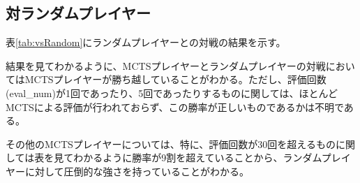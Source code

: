 \documentclass{jsarticle}
\begin{document}
\subsection{対ランダムプレイヤー}
表\ref{tab:vsRandom}にランダムプレイヤーとの対戦の結果を示す。\par
\begin{table}[hbtp]
    \caption{対ランダムプレイヤーでの勝率}
    \label{tab:vsRandom}
    \begin{center}
    \end{center}
\end{table}
結果を見てわかるように、MCTSプレイヤーとランダムプレイヤーの対戦においてはMCTSプレイヤーが勝ち越していることがわかる。ただし、評価回数(eval\_num)が1回であったり、5回であったりするものに関しては、ほとんどMCTSによる評価が行われておらず、この勝率が正しいものであるかは不明である。\par
その他のMCTSプレイヤーについては、特に、評価回数が30回を超えるものに関しては表を見てわかるように勝率が9割を超えていることから、ランダムプレイヤーに対して圧倒的な強さを持っていることがわかる。
\newpage
\end{document}
